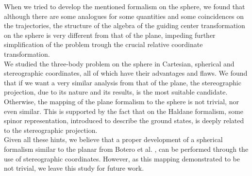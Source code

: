 When we tried to develop the mentioned formalism on the sphere, we found that although there are some analogues for some quantities and some coincidences on the trajectories, the structure of the algebra of the guiding center transformation on the sphere is very different from that of the plane, impeding further simplification of the problem trough the crucial relative coordinate transformation.\\

We studied the three-body problem on the sphere in Cartesian, spherical and stereographic coordinates, all of which have their advantages and flaws. We found that if we want a very similar analysis from that of the plane, the stereographic projection, due to its nature and its results, is the most suitable candidate. Otherwise, the mapping of the plane formalism to the sphere is not trivial, nor even similar.  This is supported by the fact that on the Haldane formalism, some spinor representation, introduced to describe the ground states, is deeply related to the stereographic projection.\\

Given all these hints, we believe that a proper development of a spherical formalism similar to the planar from Botero et al. \cite{alonso}, can be performed through the use of stereographic coordinates. However, as this mapping demonstrated to be not trivial, we leave this study for future work.\\

